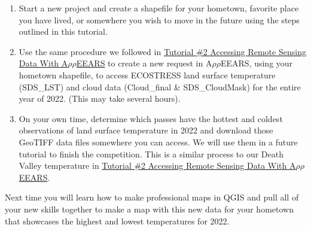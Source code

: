 \documentclass[oneside,a4paper,11pt,explicit]{book}
\begin{document}
	\begin{tcolorbox}[enhanced,attach boxed title to top center={yshift=-3mm,yshifttext=-1mm},
		colback=red!5!white,colframe=red!70!blue,colbacktitle=red!70!blue,
		title=Temperature Competition Instructions,fonttitle=\bfseries,
		boxed title style={size=small,colframe=red!50!black} ]
		
		\begin{enumerate}
			\item Start a new project and create a shapefile for your hometown, favorite place you have lived, or somewhere you wish to move in the future using the steps outlined in this tutorial.
			\item  Use the same procedure we followed in \href{https://jeremydforsythe.github.io/icecream-tutorials/Tutorial2_AccessingRemoteSensingDataWithAppears/Tutorial2_AccessingRemoteSensingDataWithAppears.pdf}{Tutorial \#2 Accessing Remote Sensing Data With A$\rho\rho$EEARS} to create a new request in A$\rho\rho$EEARS, using your hometown shapefile, to access ECOSTRESS land surface temperature (SDS\_LST) and cloud data (Cloud\_final \& SDS\_CloudMask)  for the entire year of 2022. (This may take several hours).
			\item On your own time, determine which passes have the hottest and coldest observations of land surface temperature in 2022 and download those GeoTIFF data files somewhere you can access. We will use them in a future tutorial to finish the competition. This is a similar process to our Death Valley temperature in \href{https://jeremydforsythe.github.io/icecream-tutorials/Tutorial2_AccessingRemoteSensingDataWithAppears/Tutorial2_AccessingRemoteSensingDataWithAppears.pdf}{Tutorial \#2 Accessing Remote Sensing Data With A$\rho\rho$EEARS}.  
		\end{enumerate}
		
		
	\end{tcolorbox} 
	
	\begin{tcolorbox}[colback=gray!5!white,colframe=blue!65!green,title=Next Tutorial]
		Next time you will learn how to make professional maps in QGIS and pull all of your new skills together to make a map with this new data for your hometown that showcases the highest and lowest temperatures for 2022. 
	\end{tcolorbox}
\end{document}
